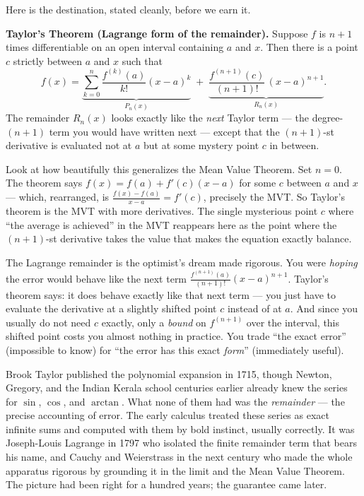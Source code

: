 Here is the destination, stated cleanly, before we earn it.

\begin{focusbox}
\textbf{Taylor's Theorem (Lagrange form of the remainder).} Suppose $f$ is $n+1$
times differentiable on an open interval containing $a$ and $x$. Then there is a
point $c$ strictly between $a$ and $x$ such that
\[
  f(x) = \underbrace{\sum_{k=0}^{n} \frac{f^{(k)}(a)}{k!}(x-a)^k}_{P_n(x)}
       \; + \; \underbrace{\frac{f^{(n+1)}(c)}{(n+1)!}\,(x-a)^{n+1}}_{R_n(x)}.
\]
The remainder $R_n(x)$ looks exactly like the \emph{next} Taylor term --- the
degree-$(n+1)$ term you would have written next --- except that the
$(n+1)$-st derivative is evaluated not at $a$ but at some mystery point $c$ in between.
\end{focusbox}

Look at how beautifully this generalizes the Mean Value Theorem. Set $n=0$. The
theorem says $f(x) = f(a) + f'(c)(x-a)$ for some $c$ between $a$ and $x$ --- which,
rearranged, is $\frac{f(x)-f(a)}{x-a} = f'(c)$, precisely the MVT. So Taylor's
theorem is the MVT with more derivatives. The single mysterious point $c$ where ``the
average is achieved'' in the MVT reappears here as the point where the
$(n+1)$-st derivative takes the value that makes the equation exactly balance.

\begin{intuitionbox}
The Lagrange remainder is the optimist's dream made rigorous. You were \emph{hoping}
the error would behave like the next term $\frac{f^{(n+1)}(a)}{(n+1)!}(x-a)^{n+1}$.
Taylor's theorem says: it does behave exactly like that next term --- you just have
to evaluate the derivative at a slightly shifted point $c$ instead of at $a$. And
since you usually do not need $c$ exactly, only a \emph{bound} on $f^{(n+1)}$ over
the interval, this shifted point costs you almost nothing in practice. You trade
``the exact error'' (impossible to know) for ``the error has this exact \emph{form}''
(immediately useful).
\end{intuitionbox}

\begin{historybox}
Brook Taylor published the polynomial expansion in 1715, though Newton, Gregory, and
the Indian Kerala school centuries earlier already knew the series for $\sin$,
$\cos$, and $\arctan$. What none of them had was the \emph{remainder} --- the precise
accounting of error. The early calculus treated these series as exact infinite sums
and computed with them by bold instinct, usually correctly. It was Joseph-Louis
Lagrange in 1797 who isolated the finite remainder term that bears his name, and
Cauchy and Weierstrass in the next century who made the whole apparatus rigorous by
grounding it in the limit and the Mean Value Theorem. The picture had been right for a
hundred years; the guarantee came later.
\end{historybox}

